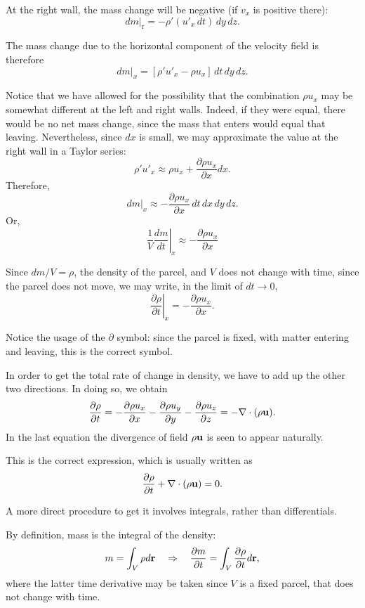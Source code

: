 At the right wall, the mass change will be negative (if $v_x$ is positive
there):
\[
\left. d m \right|_\text{r} =
 -  \rho' ( u'_x \, dt) \, dy\, dz .
\]

The mass change due to the horizontal component of the velocity field is
therefore
\[
\left. d m \right|_x =
  \left[  \rho'  u'_x -  \rho  u_x \right] \, dt \, dy\, dz .
\]

Notice that we have allowed for the possibility that the combination
$\rho u_x$ may be somewhat different at the left and right
walls. Indeed, if they were equal, there would be no net mass change,
since the mass that enters would equal that leaving. Nevertheless,
since $dx$ is small, we may approximate the value at the right
wall in a Taylor series:
\[
\rho'  u'_x \approx  \rho  u_x  +
\frac{\partial  \rho  u_x}{\partial x} dx .
\]
Therefore,
\[
\left. d m \right|_x \approx
-\frac{\partial  \rho  u_x}{\partial x} \, dt \, dx \, dy\, dz .
\]
Or,
\[
\frac1V \left. \frac{d m}{d t} \right|_x \approx
-\frac{\partial  \rho  u_x}{\partial x}
\]

Since $dm/V=\rho$, the density of the parcel, and $V$ does not change with time, since the parcel does not move, we may write, in the
limit of $dt\to 0$,
\[
\left. \frac{\partial \rho}{\partial t} \right|_x =
-\frac{\partial  \rho  u_x}{\partial x} .
\]

Notice the usage of the $\partial$ symbol: since the parcel is
fixed, with matter entering and leaving, this is the correct
symbol.

In order to get the total rate of change in density, we have to
add up the other two directions. In doing so, we obtain
\begin{equation}
  \label{eq:continuity0}
  \frac{\partial \rho}{\partial t} =
  -\frac{\partial  \rho  u_x}{\partial x}
    -\frac{\partial  \rho  u_y}{\partial y}
    -\frac{\partial  \rho  u_z}{\partial z}  =
    -\nabla\cdot ( \rho  \mathbf{u}) .
\end{equation}
In the last equation the divergence of field $ \rho \mathbf{u}$ is
seen to appear naturally.

This is the correct expression, which is usually written as
\begin{equation}
  \label{eq:continuity}
  \frac{\partial \rho }{\partial t} +  \nabla \cdot (\rho \mathbf{u} ) = 0 .
\end{equation}


A more direct procedure to get it involves integrals, rather
than differentials.

By definition, mass is the integral of the density:
\[
m = \int_V \rho d\mathbf{r} \quad \Rightarrow \quad \frac{\partial m}{\partial t} = \int_V \frac{\partial \rho}{\partial t}  d\mathbf{r},
\]
where the latter time derivative may be taken since $V$ is a fixed parcel, that does not change with time.

